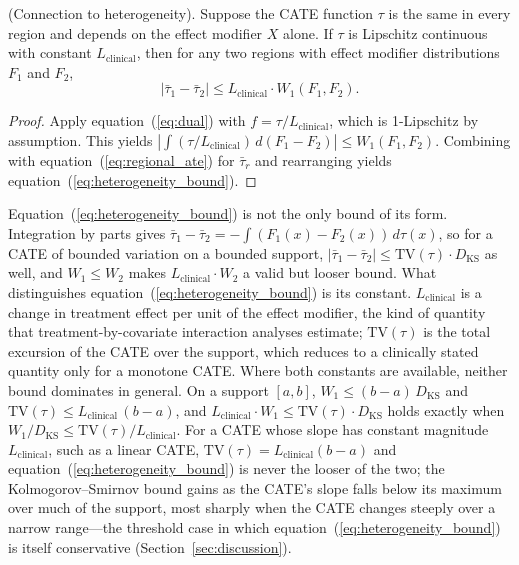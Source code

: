 \begin{proposition}\label{prop:heterogeneity}
\textup{(Connection to heterogeneity).} Suppose the CATE function $\tau$ is the same in every region and depends on the effect modifier $X$ alone. If $\tau$ is Lipschitz continuous with constant $L_{\text{clinical}}$, then for any two regions with effect modifier distributions $F_1$ and $F_2$,
\begin{equation}
|\bar{\tau}_1 - \bar{\tau}_2| \leq L_{\text{clinical}} \cdot W_1(F_1, F_2).
\label{eq:heterogeneity_bound}
\end{equation}
\end{proposition}

\begin{proof}
Apply equation~(\ref{eq:dual}) with $f = \tau / L_{\text{clinical}}$, which is 1-Lipschitz by assumption. This yields $\left|\int (\tau / L_{\text{clinical}}) \, d(F_1 - F_2)\right| \leq W_1(F_1, F_2)$. Combining with equation~(\ref{eq:regional_ate}) for $\bar{\tau}_r$ and rearranging yields equation~(\ref{eq:heterogeneity_bound}).
\end{proof}

\noindent Equation~(\ref{eq:heterogeneity_bound}) is not the only bound of its form. Integration by parts gives $\bar{\tau}_1 - \bar{\tau}_2 = -\int (F_1(x) - F_2(x)) \, d\tau(x)$, so for a CATE of bounded variation on a bounded support, $|\bar{\tau}_1 - \bar{\tau}_2| \leq \mathrm{TV}(\tau) \cdot D_{\text{KS}}$ as well, and $W_1 \leq W_2$ makes $L_{\text{clinical}} \cdot W_2$ a valid but looser bound.\cite{villani2009} What distinguishes equation~(\ref{eq:heterogeneity_bound}) is its constant. $L_{\text{clinical}}$ is a change in treatment effect per unit of the effect modifier, the kind of quantity that treatment-by-covariate interaction analyses estimate; $\mathrm{TV}(\tau)$ is the total excursion of the CATE over the support, which reduces to a clinically stated quantity only for a monotone CATE. Where both constants are available, neither bound dominates in general. On a support $[a, b]$, $W_1 \leq (b - a)\,D_{\text{KS}}$ and $\mathrm{TV}(\tau) \leq L_{\text{clinical}}\,(b - a)$, and $L_{\text{clinical}} \cdot W_1 \leq \mathrm{TV}(\tau) \cdot D_{\text{KS}}$ holds exactly when $W_1 / D_{\text{KS}} \leq \mathrm{TV}(\tau) / L_{\text{clinical}}$. For a CATE whose slope has constant magnitude $L_{\text{clinical}}$, such as a linear CATE, $\mathrm{TV}(\tau) = L_{\text{clinical}}(b - a)$ and equation~(\ref{eq:heterogeneity_bound}) is never the looser of the two; the Kolmogorov--Smirnov bound gains as the CATE's slope falls below its maximum over much of the support, most sharply when the CATE changes steeply over a narrow range---the threshold case in which equation~(\ref{eq:heterogeneity_bound}) is itself conservative (Section~\ref{sec:discussion}).

